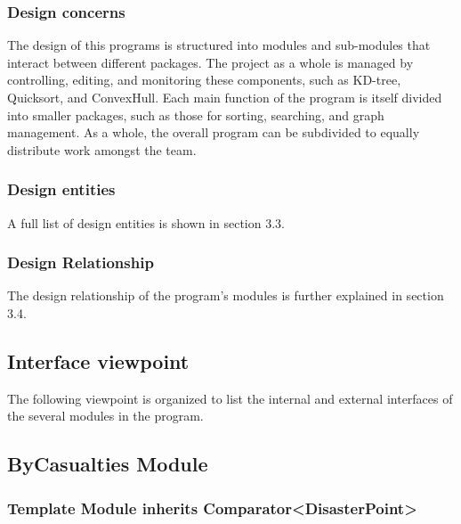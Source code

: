 \documentclass[12pt]{article}
\begin{document}
            \subsubsection{Design concerns}
                The design of this programs is structured into modules and sub-modules that interact between different packages. The project as a whole is managed by controlling, editing, and monitoring these components, such as KD-tree, Quicksort, and ConvexHull. Each main function of the program is itself divided into smaller packages, such as those for sorting, searching, and graph management. As a whole, the overall program can be subdivided to equally distribute work amongst the team.
                
            \subsubsection{Design entities}
                A full list of design entities is shown in section 3.3.
            \subsubsection{Design Relationship}
                The design relationship of the program's modules is further explained in section 3.4.
        \subsection{Interface viewpoint}%
        The following viewpoint is organized to list the internal and external interfaces of the several modules in the program.
                \newpage
                \subsection* {ByCasualties Module}
                
                \subsubsection*{Template Module inherits Comparator<DisasterPoint>}
                
\end{document}
